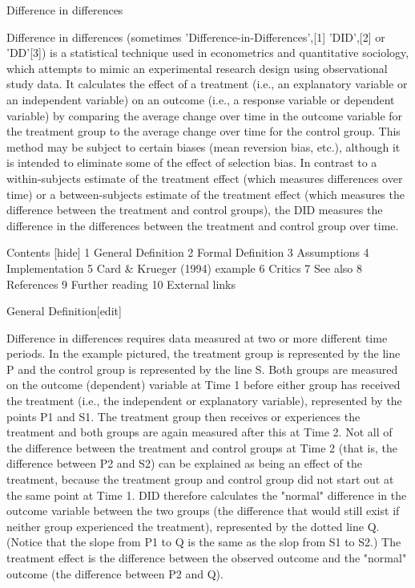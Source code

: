Difference in differences




Difference in differences (sometimes 'Difference-in-Differences',[1] 'DID',[2] or 'DD'[3]) is a statistical technique used in econometrics and quantitative sociology, which attempts to mimic an experimental research design using observational study data. It calculates the effect of a treatment (i.e., an explanatory variable or an independent variable) on an outcome (i.e., a response variable or dependent variable) by comparing the average change over time in the outcome variable for the treatment group to the average change over time for the control group. This method may be subject to certain biases (mean reversion bias, etc.), although it is intended to eliminate some of the effect of selection bias. In contrast to a within-subjects estimate of the treatment effect (which measures differences over time) or a between-subjects estimate of the treatment effect (which measures the difference between the treatment and control groups), the DID measures the difference in the differences between the treatment and control group over time.
 



Contents
  [hide]  1 General Definition
 2 Formal Definition
 3 Assumptions
 4 Implementation
 5 Card & Krueger (1994) example
 6 Critics
 7 See also
 8 References
 9 Further reading
 10 External links
 

General Definition[edit]
 





Difference in differences requires data measured at two or more different time periods. In the example pictured, the treatment group is represented by the line P and the control group is represented by the line S. Both groups are measured on the outcome (dependent) variable at Time 1 before either group has received the treatment (i.e., the independent or explanatory variable), represented by the points P1 and S1. The treatment group then receives or experiences the treatment and both groups are again measured after this at Time 2. Not all of the difference between the treatment and control groups at Time 2 (that is, the difference between P2 and S2) can be explained as being an effect of the treatment, because the treatment group and control group did not start out at the same point at Time 1. DID therefore calculates the "normal" difference in the outcome variable between the two groups (the difference that would still exist if neither group experienced the treatment), represented by the dotted line Q. (Notice that the slope from P1 to Q is the same as the slop from S1 to S2.) The treatment effect is the difference between the observed outcome and the "normal" outcome (the difference between P2 and Q).
 
